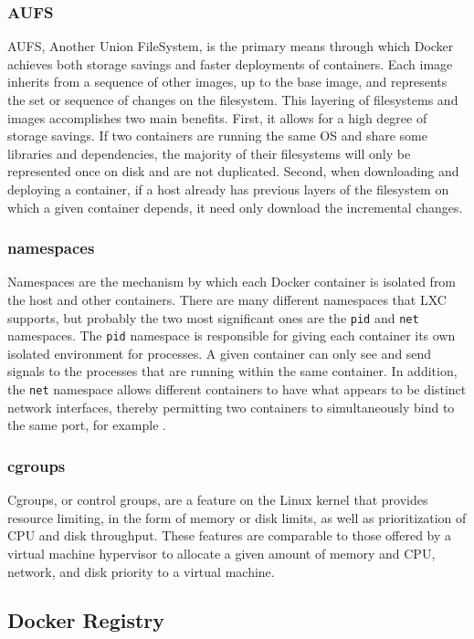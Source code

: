 \documentclass[\myfontsize, letterpaper]{article}
\begin{document}
\subsubsection{AUFS}
AUFS, Another Union FileSystem, is the primary means through which Docker achieves both storage savings and faster deployments of containers. Each image inherits from a sequence of other images, up to the base image, and represents the set or sequence of changes on the filesystem. This layering of filesystems and images accomplishes two main benefits. First, it allows for a high degree of storage savings. If two containers are running the same OS and share some libraries and dependencies, the majority of their filesystems will only be represented once on disk and are not duplicated. Second, when downloading and deploying a container, if a host already has previous layers of the filesystem on which a given container depends, it need only download the incremental changes.

\subsubsection{namespaces}
Namespaces are the mechanism by which each Docker container is isolated from the host and other containers. There are many different namespaces that LXC supports, but probably the two most significant ones are the \texttt{pid} and \texttt{net} namespaces. The \texttt{pid} namespace is responsible for giving each container its own isolated environment for processes. A given container can only see and send signals to the processes that are running within the same container. In addition, the \texttt{net} namespace allows different containers to have what appears to be distinct network interfaces, thereby permitting two containers to simultaneously bind to the same port, for example \cite{lxc}.


\subsubsection{cgroups}
Cgroups, or control groups, are a feature on the Linux kernel that provides resource limiting, in the form of memory or disk limits, as well as prioritization of CPU and disk throughput. These features are comparable to those offered by a virtual machine hypervisor to allocate a given amount of memory and CPU, network, and disk priority to a virtual machine.

\subsection{Docker Registry}
\end{document}
